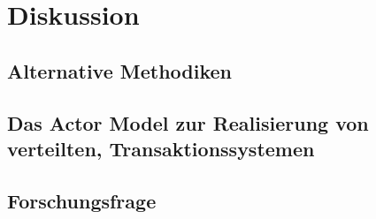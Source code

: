




\chapter{Diskussion}
\section{Alternative Methodiken}
\section{Das Actor Model zur Realisierung von verteilten, Transaktionssystemen} 
\section{Forschungsfrage}  